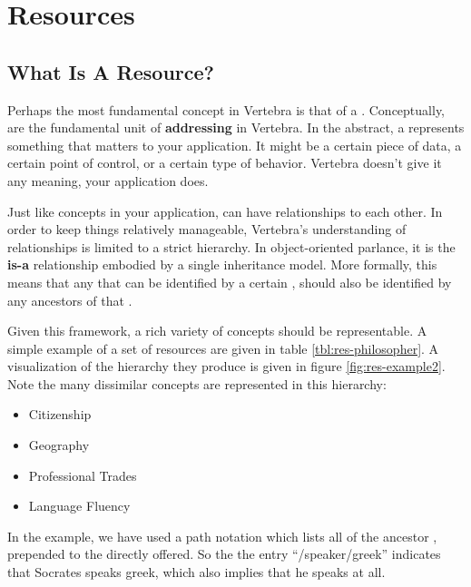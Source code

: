 \section{Resources}


\subsection{What Is A Resource?}

\label{ref:define-resource}

Perhaps the most fundamental concept in Vertebra is that of a \resource{}.  Conceptually, \resources{} are the fundamental unit of \textbf{addressing} in Vertebra.  In the abstract, a \resource{} represents something that matters to your application.  It might be a certain piece of data, a certain point of control, or a certain type of behavior.  Vertebra doesn't give it any meaning, your application does.

Just like concepts in your application, \resources{} can have relationships to each other.  In order to keep things relatively manageable, Vertebra's understanding of relationships is limited to a strict hierarchy.  In object-oriented parlance, it is the {\bf is-a} relationship embodied by a single inheritance model.  More formally, this means that any \agent{} that can be identified by a certain \resource, should also be identified by any ancestors of that \resource{}.

Given this framework, a rich variety of concepts should be representable.  A simple example of a set of resources are given in table \ref{tbl:res-philosopher}.  A visualization of the hierarchy they produce is given in figure \ref{fig:res-example2}.  Note the many dissimilar concepts are represented in this \resource{} hierarchy:

\begin{itemize}
        \item Citizenship
        \item Geography
        \item Professional Trades
        \item Language Fluency
\end{itemize}

In the example, we have used a path notation which lists all of the ancestor \resources{}, prepended to the \resource{} directly offered.  So the the entry ``{\sf/speaker/greek}'' indicates that Socrates speaks greek, which also implies that he speaks at all.

